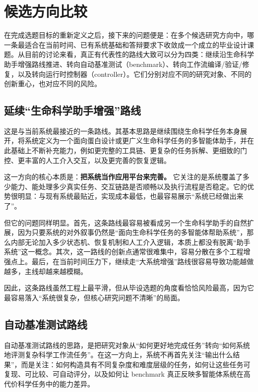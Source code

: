 \section{候选方向比较}

在完成选题目标的重新定义之后，接下来的问题便是：在多个候选研究方向中，哪一条最适合在当前时间、已有系统基础和答辩要求下收敛成一个成立的毕业设计课题。从目前的讨论来看，真正有代表性的路线大致可以分为四类：继续沿生命科学助手增强路线推进、转向自动基准测试（benchmark）、转向工作流编译/验证/修复，以及转向运行时控制器（controller）。它们分别对应不同的研究对象、不同的创新重心，也对应不同的风险。

\subsection{延续“生命科学助手增强”路线}

这是与当前系统最接近的一条路线。其基本思路是继续围绕生命科学任务本身展开，将系统定义为一个面向蛋白设计或更广义生命科学任务的多智能体助手，并在此基础上不断补充能力，例如更完整的工具链、更复杂的任务拆解、更细致的门控、更丰富的人工介入交互，以及更完善的恢复逻辑。

这一方向的核心本质是：\textbf{把系统当作应用平台来完善。} 它关注的是系统覆盖了多少能力、能处理多少真实任务、交互链路是否顺畅以及执行流程是否稳定。它的优势很明显：与现有系统最贴近，实现成本最低，也最容易展示“系统已经做出来了”。

但它的问题同样明显。首先，这条路线最容易被看成另一个生命科学助手的自然扩展，因为只要系统的对外叙事仍然是“面向生命科学任务的多智能体帮助系统”，那么内部无论加入多少状态机、恢复机制和人工介入逻辑，本质上都没有脱离“助手系统”这一概念。其次，这一路线的创新点通常很难集中，容易分散在多个工程增强点上。最后，在当前时间压力下，继续走“大系统增强”路线很容易导致功能越做越多，主线却越来越模糊。

因此，这条路线虽然工程上最平滑，但从毕设选题的角度看恰恰风险最高，因为它最容易落入“系统很复杂，但核心研究问题不清晰”的局面。

\subsection{自动基准测试路线}

自动基准测试路线的思路，是把研究对象从“如何更好地完成任务”转向“如何系统地评测复杂科学工作流任务”。在这一方向上，系统不再首先关注“输出什么结果”，而是关注：如何构造具有不同复杂度和难度层级的任务，如何让这些任务可复现、可比较、可自动评分，以及如何让 benchmark 真正反映多智能体系统在高代价科学任务中的能力差异。

